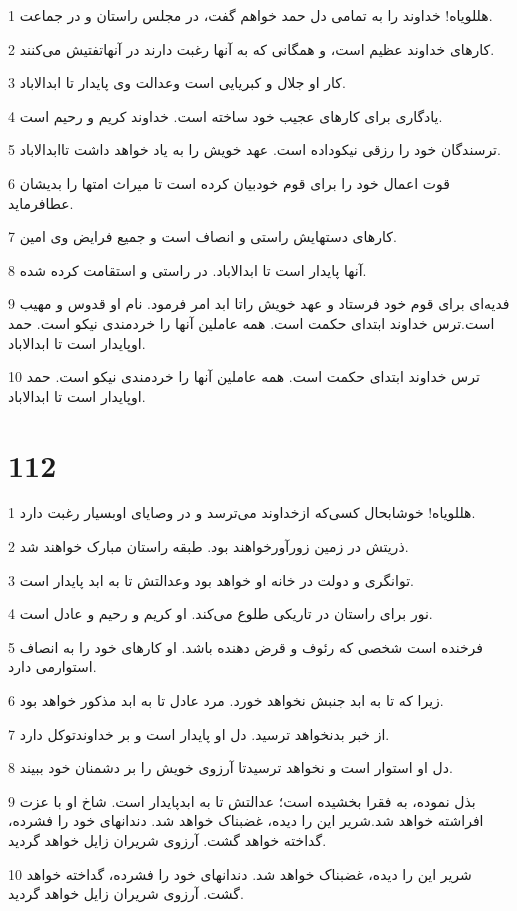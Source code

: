\par 1 هللویاه! خداوند را به تمامی دل حمد خواهم گفت، در مجلس راستان و در جماعت.
\par 2 کارهای خداوند عظیم است، و همگانی که به آنها رغبت دارند در آنهاتفتیش می‌کنند.
\par 3 کار او جلال و کبریایی است وعدالت وی پایدار تا ابدالاباد.
\par 4 یادگاری برای کارهای عجیب خود ساخته است. خداوند کریم و رحیم است.
\par 5 ترسندگان خود را رزقی نیکوداده است. عهد خویش را به یاد خواهد داشت تاابدالاباد.
\par 6 قوت اعمال خود را برای قوم خودبیان کرده است تا میراث امتها را بدیشان عطافرماید.
\par 7 کارهای دستهایش راستی و انصاف است و جمیع فرایض وی امین.
\par 8 آنها پایدار است تا ابدالاباد. در راستی و استقامت کرده شده.
\par 9 فدیه‌ای برای قوم خود فرستاد و عهد خویش راتا ابد امر فرمود. نام او قدوس و مهیب است.ترس خداوند ابتدای حکمت است. همه عاملین آنها را خردمندی نیکو است. حمد اوپایدار است تا ابدالاباد.
\par 10 ترس خداوند ابتدای حکمت است. همه عاملین آنها را خردمندی نیکو است. حمد اوپایدار است تا ابدالاباد.
 
\chapter{112}

\par 1 هللویاه! خوشابحال کسی‌که ازخداوند می‌ترسد و در وصایای اوبسیار رغبت دارد.
\par 2 ذریتش در زمین زورآورخواهند بود. طبقه راستان مبارک خواهند شد.
\par 3 توانگری و دولت در خانه او خواهد بود وعدالتش تا به ابد پایدار است.
\par 4 نور برای راستان در تاریکی طلوع می‌کند. او کریم و رحیم و عادل است.
\par 5 فرخنده است شخصی که رئوف و قرض دهنده باشد. او کارهای خود را به انصاف استوارمی دارد.
\par 6 زیرا که تا به ابد جنبش نخواهد خورد. مرد عادل تا به ابد مذکور خواهد بود.
\par 7 از خبر بدنخواهد ترسید. دل او پایدار است و بر خداوندتوکل دارد.
\par 8 دل او استوار است و نخواهد ترسیدتا آرزوی خویش را بر دشمنان خود ببیند.
\par 9 بذل نموده، به فقرا بخشیده است؛ عدالتش تا به ابدپایدار است. شاخ او با عزت افراشته خواهد شد.شریر این را دیده، غضبناک خواهد شد. دندانهای خود را فشرده، گداخته خواهد گشت. آرزوی شریران زایل خواهد گردید.
\par 10 شریر این را دیده، غضبناک خواهد شد. دندانهای خود را فشرده، گداخته خواهد گشت. آرزوی شریران زایل خواهد گردید.
 
